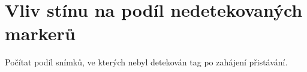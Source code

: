   \section{Vliv stínu na podíl nedetekovaných markerů}
    Počítat podíl snímků, ve kterých nebyl detekován tag po zahájení přistávání.
